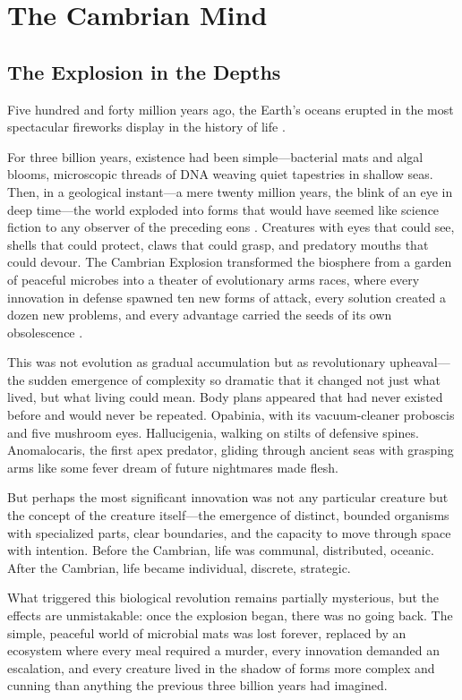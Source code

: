 \chapter{The Cambrian Mind}

\section{The Explosion in the Depths}

Five hundred and forty million years ago, the Earth's oceans erupted in the most spectacular fireworks display in the history of life \parencite{marshall2006explaining}.

For three billion years, existence had been simple—bacterial mats and algal blooms, microscopic threads of DNA weaving quiet tapestries in shallow seas. Then, in a geological instant—a mere twenty million years, the blink of an eye in deep time—the world exploded into forms that would have seemed like science fiction to any observer of the preceding eons \parencite{erwin2011cambrian}. Creatures with eyes that could see, shells that could protect, claws that could grasp, and predatory mouths that could devour. The Cambrian Explosion transformed the biosphere from a garden of peaceful microbes into a theater of evolutionary arms races, where every innovation in defense spawned ten new forms of attack, every solution created a dozen new problems, and every advantage carried the seeds of its own obsolescence \parencite{gould1989wonderful}.

This was not evolution as gradual accumulation but as revolutionary upheaval—the sudden emergence of complexity so dramatic that it changed not just what lived, but what living could mean. Body plans appeared that had never existed before and would never be repeated. Opabinia, with its vacuum-cleaner proboscis and five mushroom eyes. Hallucigenia, walking on stilts of defensive spines. Anomalocaris, the first apex predator, gliding through ancient seas with grasping arms like some fever dream of future nightmares made flesh.

But perhaps the most significant innovation was not any particular creature but the concept of the creature itself—the emergence of distinct, bounded organisms with specialized parts, clear boundaries, and the capacity to move through space with intention. Before the Cambrian, life was communal, distributed, oceanic. After the Cambrian, life became individual, discrete, strategic.

What triggered this biological revolution remains partially mysterious, but the effects are unmistakable: once the explosion began, there was no going back. The simple, peaceful world of microbial mats was lost forever, replaced by an ecosystem where every meal required a murder, every innovation demanded an escalation, and every creature lived in the shadow of forms more complex and cunning than anything the previous three billion years had imagined.

